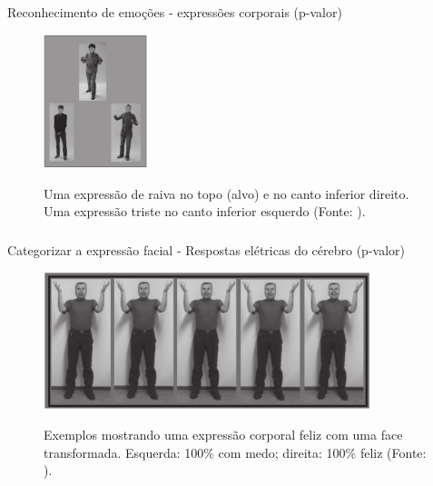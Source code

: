 \begin{frame}
    \frametitle{}
    Reconhecimento de emoções - expressões corporais (p-valor)
    \begin{figure}[!ht]
        \centering
        \caption{Uma expressão de raiva no topo (alvo) e no canto inferior direito. 
        Uma expressão triste no canto inferior esquerdo (Fonte: \textcite{van2007body}).}
          \includegraphics[width=0.27\textwidth]{images/van2007body0.png}
        \label{fig:van2007body}
    \end{figure}
\end{frame}
\begin{frame}
    \frametitle{}
    Categorizar a expressão facial - Respostas elétricas do cérebro (p-valor)
    \begin{figure}[!ht]
        \centering
        \caption{Exemplos mostrando uma expressão corporal feliz com uma face 
        transformada. 
        Esquerda: 100\% com medo; direita: 100\% feliz (Fonte: \textcite{van2007body}).}
          \includegraphics[width=0.85\textwidth]{images/van2007body.png}
        \label{fig:van2007body:2}
    \end{figure}
\end{frame}

